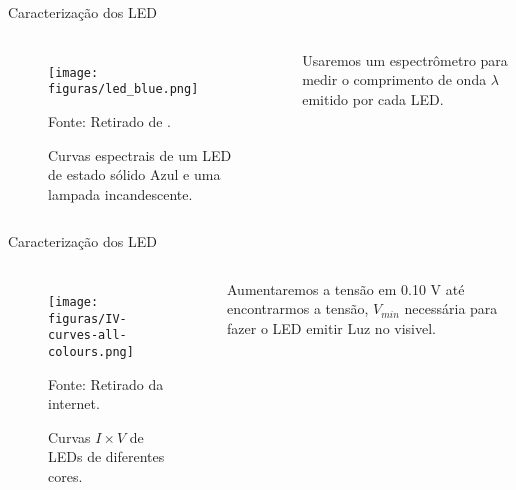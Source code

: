 \documentclass[aspectratio=169,12.5pt,xcolor=dvipsnames]{beamer}
\begin{document}
\begin{frame}{Caracterização dos LED}

    \begin{columns}[c]
        \begin{figure}
          \centering
          \caption{Curvas espectrais de um LED de estado sólido Azul e uma lampada incandescente.}
          \texttt{[image: figuras/led\_blue.png]}\par
          {\scriptsize Fonte: Retirado de \cite{Song2019}.}
        \end{figure}


        Usaremos um espectrômetro para medir o comprimento de onda $\lambda$ emitido por cada LED.
    
    \end{columns}

    
\end{frame}


\begin{frame}{Caracterização dos LED}

    \begin{columns}[c]
        \begin{figure}
          \centering
          \caption{Curvas $I\times V$ de LEDs de diferentes cores.}
          \texttt{[image: figuras/IV-curves-all-colours.png]}\par
          {\scriptsize Fonte: Retirado da internet.}
        \end{figure}

        Aumentaremos a tensão em 0.10 V até encontrarmos a tensão, $V_{min}$ necessária para fazer o LED emitir Luz no visivel.
    
    \end{columns}


\end{frame}

\end{document}
